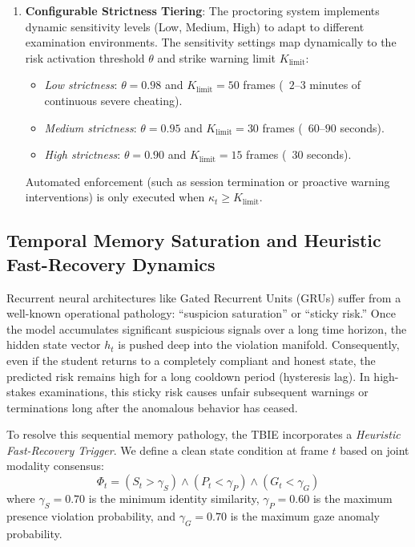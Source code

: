 \documentclass[journal]{IEEEtran}
\begin{document}
\begin{enumerate}
    \item \textbf{Configurable Strictness Tiering}: The proctoring system implements dynamic sensitivity levels (Low, Medium, High) to adapt to different examination environments. The sensitivity settings map dynamically to the risk activation threshold $\theta$ and strike warning limit $K_{\mathrm{limit}}$:
    \begin{itemize}
        \item \emph{Low strictness}: $\theta = 0.98$ and $K_{\mathrm{limit}} = 50$ frames (~$2$--$3$ minutes of continuous severe cheating).
        \item \emph{Medium strictness}: $\theta = 0.95$ and $K_{\mathrm{limit}} = 30$ frames (~$60$--$90$ seconds).
        \item \emph{High strictness}: $\theta = 0.90$ and $K_{\mathrm{limit}} = 15$ frames (~$30$ seconds).
    \end{itemize}
    Automated enforcement (such as session termination or proactive warning interventions) is only executed when $\kappa_t \ge K_{\mathrm{limit}}$.
\end{enumerate}

\subsection{Temporal Memory Saturation and Heuristic Fast-Recovery Dynamics}

Recurrent neural architectures like Gated Recurrent Units (GRUs) suffer from a well-known operational pathology: ``suspicion saturation'' or ``sticky risk.'' Once the model accumulates significant suspicious signals over a long time horizon, the hidden state vector $h_t$ is pushed deep into the violation manifold. Consequently, even if the student returns to a completely compliant and honest state, the predicted risk remains high for a long cooldown period (hysteresis lag). In high-stakes examinations, this sticky risk causes unfair subsequent warnings or terminations long after the anomalous behavior has ceased.

To resolve this sequential memory pathology, the TBIE incorporates a \emph{Heuristic Fast-Recovery Trigger}. We define a clean state condition at frame $t$ based on joint modality consensus:
\begin{equation}
    \Phi_t = (S_t > \gamma_S) \land (P_t < \gamma_P) \land (G_t < \gamma_G)
\end{equation}
where $\gamma_S = 0.70$ is the minimum identity similarity, $\gamma_P = 0.60$ is the maximum presence violation probability, and $\gamma_G = 0.70$ is the maximum gaze anomaly probability. 
\end{document}

